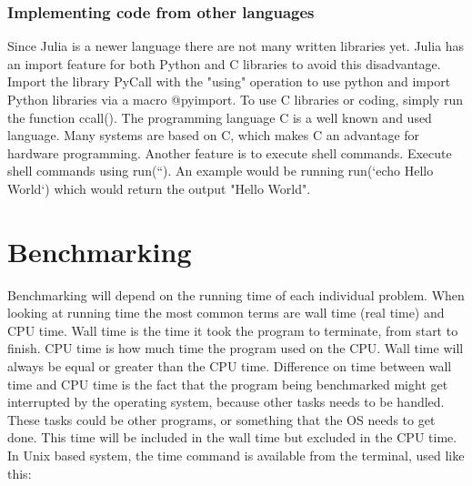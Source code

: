 \documentclass[a4paper,11pt]{article}
\begin{document}
\subsubsection{Implementing code from other languages}
Since Julia is a newer language there are not many written libraries yet. Julia has an import feature for both Python and C libraries to avoid this disadvantage. Import the library PyCall with the "using" operation to use python and import Python libraries via a macro @pyimport. To use C libraries or coding, simply run the function ccall(). The programming language C is a well known and used language. Many systems are based on C, which makes C an advantage for hardware programming. Another feature is to execute shell commands. Execute shell commands using run(``). An example would be running run(`echo Hello World`) which would return the output "Hello World".

\section{Benchmarking}
Benchmarking will depend on the running time of each individual problem. When looking at running time the most common terms are wall time (real time) and CPU time. Wall time is the time it took the program to terminate, from start to finish. CPU time is how much time the program used on the CPU. Wall time will always be equal or greater than the CPU time. Difference on time between wall time and CPU time is the fact that the program being benchmarked might get interrupted by the operating system, because other tasks needs to be handled. These tasks could be other programs, or something that the OS needs to get done. This time will be included in the wall time but excluded in the CPU time. In Unix based system, the time command is available from the terminal, used like this:
\end{document}
